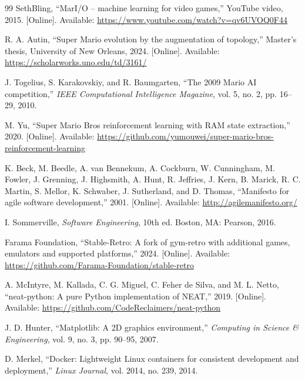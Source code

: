 \begin{thebibliography}{99}
SethBling, ``MarI/O -- machine learning for video games,'' YouTube video,
2015. [Online]. Available:
\url{https://www.youtube.com/watch?v=qv6UVOQ0F44}

R. A. Autin, ``Super Mario evolution by the augmentation of topology,''
Master's thesis, University of New Orleans, 2024. [Online]. Available:
\url{https://scholarworks.uno.edu/td/3161/}

J. Togelius, S. Karakovskiy, and R. Baumgarten, ``The 2009 Mario AI
competition,'' \emph{IEEE Computational Intelligence Magazine}, vol. 5,
no. 2, pp. 16--29, 2010.

M. Yu, ``Super Mario Bros reinforcement learning with RAM state extraction,''
2020. [Online]. Available:
\url{https://github.com/yumouwei/super-mario-bros-reinforcement-learning}

K. Beck, M. Beedle, A. van Bennekum, A. Cockburn, W. Cunningham, M. Fowler,
J. Grenning, J. Highsmith, A. Hunt, R. Jeffries, J. Kern, B. Marick,
R. C. Martin, S. Mellor, K. Schwaber, J. Sutherland, and D. Thomas,
``Manifesto for agile software development,'' 2001. [Online]. Available:
\url{http://agilemanifesto.org/}

I. Sommerville, \emph{Software Engineering}, 10th ed. Boston, MA: Pearson,
2016.

Farama Foundation, ``Stable-Retro: A fork of gym-retro with additional games,
emulators and supported platforms,'' 2024. [Online]. Available:
\url{https://github.com/Farama-Foundation/stable-retro}

A. McIntyre, M. Kallada, C. G. Miguel, C. Feher de Silva, and M. L. Netto,
``neat-python: A pure Python implementation of NEAT,'' 2019. [Online].
Available: \url{https://github.com/CodeReclaimers/neat-python}

J. D. Hunter, ``Matplotlib: A 2D graphics environment,'' \emph{Computing in
Science \& Engineering}, vol. 9, no. 3, pp. 90--95, 2007.

D. Merkel, ``Docker: Lightweight Linux containers for consistent development
and deployment,'' \emph{Linux Journal}, vol. 2014, no. 239, 2014.

\end{thebibliography}
